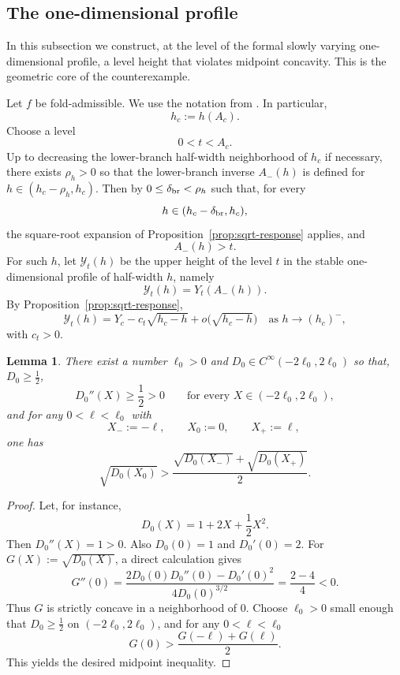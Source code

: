\documentclass[reqno,12pt]{amsart}
\numberwithin{equation}{section}
\newtheorem{lemma}[theorem]{Lemma}
\theoremstyle{remark}
\begin{document}
\subsection{The one-dimensional profile}\label{sec:slow-width}

In this subsection we construct, at the level of the formal slowly varying one-dimensional profile, a level height that violates midpoint concavity.  This is the geometric core of the counterexample.  

Let $f$ be fold-admissible.  We use the notation from .  In particular,
$$
h_c:=h(A_c).
$$
Choose a level
$$
0<t<A_c.
$$
Up to decreasing the lower-branch half-width neighborhood of $h_c$ if necessary, there exists $\rho_h>0$ so that the lower-branch inverse $A_-(h)$ is defined for $h\in(h_c -\rho_h, h_c)$.  Then by   $0\le \delta_{\rm br} < \rho_h$ such that, for every
$$
h\in(h_c-\delta_{\rm br},h_c),
$$
the square-root expansion of
Proposition~\ref{prop:sqrt-response} applies, and
\begin{equation}\label{eq:level-below-amplitude}
A_-(h)>t.
\end{equation}
For such $h$, let $\mathcal Y_t(h)$ be the upper height of the level $t$ in the
stable one-dimensional profile of half-width $h$, namely
$$
\mathcal Y_t(h)=Y_t(A_-(h)).
$$
By Proposition~\ref{prop:sqrt-response},
$$
\mathcal Y_t(h)=Y_c-c_t\sqrt{h_c-h}+o\bigl(\sqrt{h_c-h}\bigr)
\quad\text{as }h\to (h_c)^-,
$$
with $c_t>0$.

\begin{lemma}\label{lem:sloping-gap}
There exist a number $\ell_0>0$ and   $D_0\in C^\infty(-2\ell_0,2\ell_0)$ so that, $D_0\ge \frac 1 2 $, 
$$
D_0''(X)\ge \frac 1 2>0\qquad \text{for every } X\in(-2\ell_0,2\ell_0),
$$
and for any $0<\ell<\ell_0$ with
$$
X_-:=-\ell, \qquad X_0:=0, \qquad X_+:=\ell, \ 
$$
one has
$$
\sqrt{D_0(X_0)}> \frac{\sqrt{D_0(X_-)}+\sqrt{D_0(X_+)}}{2}.
$$
\end{lemma}

\begin{proof}
Let, for instance,
$$
D_0(X)=1+2X+\frac 1 2 X^2.
$$
Then $D_0''(X)=1>0$.  Also $D_0(0)=1$ and $D_0'(0)=2$.  For
$G(X):=\sqrt{D_0(X)}$, a direct calculation gives
$$
G''(0)=\frac{2D_0(0)D_0''(0)-D_0'(0)^2}{4D_0(0)^{3/2}}
=\frac{2-4}{4}<0.
$$
Thus $G$ is strictly concave in a neighborhood of $0$.  Choose $\ell_0>0$ small enough that $D_0\ge \frac 1 2$ on $(-2\ell_0,2\ell_0)$, and for any $0<\ell<\ell_0$
$$
G(0)>\frac{G(-\ell)+G(\ell)}2.
$$
This yields the desired midpoint inequality.
\end{proof}
\end{document}
